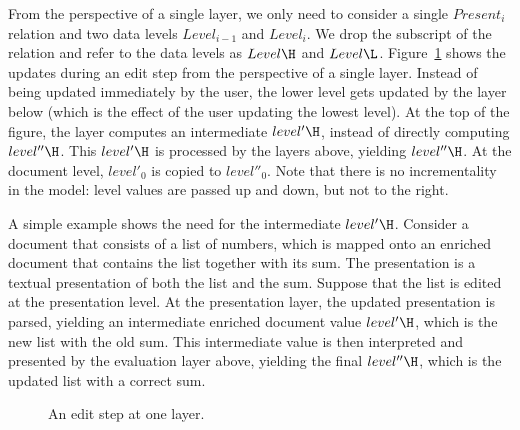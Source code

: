 From the perspective of a single layer, we only need to consider a single $Present_i$ relation and two data levels $Level_{i-1}$ and $Level_{i}$. We drop the subscript of the relation and refer to the data levels as $Level\H$ and $Level\L$. Figure~\ref{layerEditProcess} shows the updates during an edit step from the perspective of a single layer. 
Instead of being updated immediately by the user, the lower level gets updated by the layer below (which is the effect  of the user updating the lowest level). At the top of the figure, the layer computes an intermediate $level'\H$, instead of directly computing $level''\H$. This $level'\H$ is processed by the layers above, yielding $level''\H$. At the document level, $level'_0$ is copied to $level''_0$. Note that there is no incrementality in the model: level values are passed up and down, but not to the right.



A simple example shows the need for the intermediate $level'\H$. Consider a document that consists of a list of numbers, which is mapped onto an enriched document that contains the list together with its sum. The presentation is a textual presentation of both the list and the sum. Suppose that the list is edited at the presentation level. At the presentation layer, the updated presentation is parsed, yielding an intermediate enriched document value $level'\H$, which is the new list with the old sum. This intermediate value is then interpreted and presented by the evaluation layer above, yielding the final $level''\H$, which is the updated list with a correct sum.

\begin{figure}
\begin{small}
\begin{center}
\begin{center}
\end{center}\caption{An edit step at one layer.}\label{layerEditProcess} 
\end{center}
\end{small}
\end{figure}

